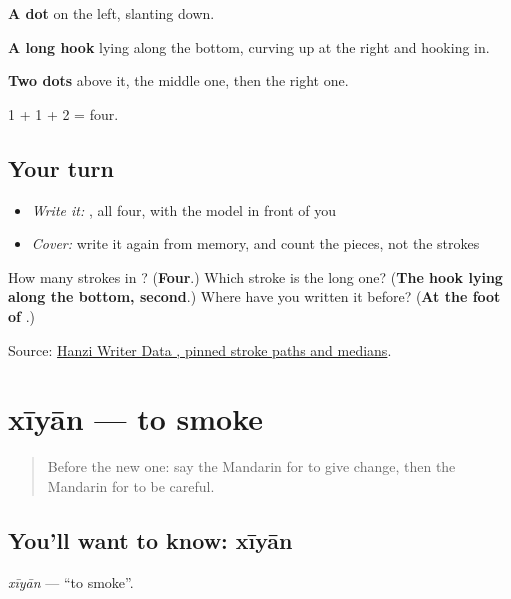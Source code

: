\begin{quote}
\end{quote}

\textbf{A dot} on the left, slanting down.

\textbf{A long hook} lying along the bottom, curving up at the right and hooking in.

\textbf{Two dots} above it, the middle one, then the right one.

1 + 1 + 2 = four.

\subsection*{Your turn}
\begin{itemize}
\raggedright
  \item \emph{Write it:} , all four, with the model in front of you
  \item \emph{Cover:} write it again from memory, and count the pieces, not the strokes
\end{itemize}

\begin{tcolorbox}[breakable,colback=teal!4,colframe=teal!35!black,title={Before you move on}]
How many strokes in ? (\textbf{Four}.) Which stroke is the long one? (\textbf{The hook lying along the bottom, second}.) Where have you written it before? (\textbf{At the foot of }.)

Source: \href{https://raw.githubusercontent.com/chanind/hanzi-writer-data/68d10a4b21150cae5e1ebbd223eed289cf32d90c/data/\%E5\%BF\%83.json}{Hanzi Writer Data , pinned stroke paths and medians}.
\end{tcolorbox}
\section[xīyān]{xīyān — to smoke}

\label{lesson:ZH-C115-xiyan}



\begin{quote}
Before the new one: say the Mandarin for to give change, then the Mandarin for to be careful.
\end{quote}

\subsection*{You'll want to know: xīyān}
\emph{xīyān} — \textquotedblleft{}to smoke\textquotedblright{}.

